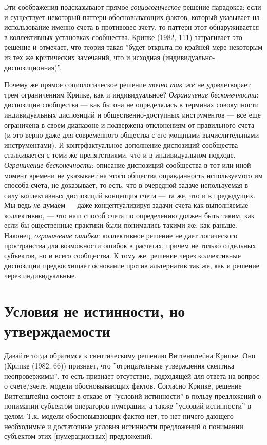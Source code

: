 \documentclass[11pt]{book}
\begin{document}
Эти соображения подсказывают прямое \textit{социологическое} решение парадокса: если и существует некоторый паттерн обосновывающих фактов, который указывает на использование именно счета в противовес зчету, то паттерн этот обнаруживается в коллективных установках сообщества. Крипке (1982, 111) затрагивает это решение и отмечает, что теория такая ''будет открыта по крайней мере некоторым из тех же критических замечаний, что и исходная (индивидуально-диспозиционная)''.

Почему же прямое социологическое решение \textit{точно так же} не удовлетворяет трем ограничениям Крипке, как и индивидуальное? \textit{Ограничение бесконечности}: диспозиция сообщества --- как бы она не определялась в терминах совокупности индивидуальных диспозиций и общественно-доступных инструментов --- все еще ограничена в своем диапазоне и подвержена отклонениям от правильного счета (и это верно даже для современного общества с его мощными вычислительными инструментами). И контрфактуальное дополнение диспозиций сообщества сталкивается с теми же препятствиями, что и в индивидуальном подходе. \textit{Ограничение бесконечности}: описание диспозиций сообщества в тот или иной момент времени не указывает на этого общества оправданность используемого им способа счета, не доказывает, то есть, что в очередной задаче используемая в силу коллективных диспозиций концепция счета --- та же, что и в предыдущих. Мы ведь \textit{не} думаем --- даже концептуализируя задачи счета как выполняемые коллективно, --- что наш способ счета по определению должен быть таким, как если бы ощественные практики были понимались такими же, как раньше. Наконец, \textit{ограничение ошибки}: коллективное решение не дает логического пространства для возможности ошибок в расчетах, причем не только отдельных субъектов, но и всего сообщества. К тому же, решение через коллективные диспозиции предвосхищает основание против альтернатив так же, как и решение через индивидуальные.

\section{Условия не истинности, но утверждаемости}

Давайте тогда обратимся к скептическому решению Витгенштейна Крипке. Оно (Крипке (1982, 66)) признает, что ''отрицательные утверждения скептика неопровержимы'', то есть признает отсутствие, подходящей для ответа на вопрос о счете/зчете, модели обосновывающих фактов. Согласно Крипке, решение Витгенштейна состоит в отказе от ''условий истинности'' в пользу предложений о понимании субъектом операторов нумерации, а также ''условий истинности'' в целом. Т.к. модели обосновывающих фактов нет, то нет ничего дающего необходимые и достаточные условия истинности предложений о понимании субъектом этих [нумерационных] предложений.
\end{document}
